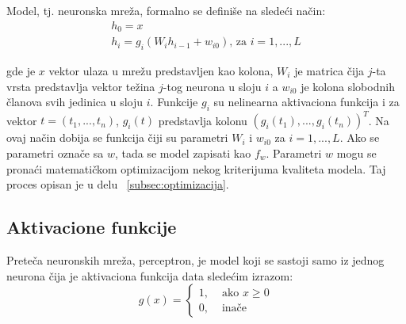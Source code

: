 Model, tj. neuronska mreža, formalno se definiše na sledeći način:
\begin{equation}
	\begin{gathered}
		h_0 = x  \\
	 	h_i = g_i(W_ih_{i-1} + w_{i0}) \text{,~za~} i=1, ..., L
	\end{gathered}
\end{equation}

gde je $x$ vektor ulaza u mrežu predstavljen kao kolona, $W_i$ je matrica čija $j$-ta vrsta predstavlja vektor težina $j$-tog neurona u sloju $i$ a $w_{i0}$ je kolona slobodnih članova svih jedinica u sloju $i$. Funkcije $g_i$ su nelinearna aktivaciona funkcija i za vektor $t=(t_1, ..., t_n)$, $g_i(t)$ predstavlja kolonu $(g_i(t_1), ..., g_i(t_n))^T$. Na ovaj način dobija se funkcija čiji su parametri $W_i$ i $w_{i0}$ za $i=1,...,L$. Ako se parametri označe sa $w$, tada se model zapisati kao $f_w$. Parametri $w$ mogu se pronaći matematičkom optimizacijom nekog kriterijuma kvaliteta modela. Taj proces opisan je u delu ~\ref{subsec:optimizacija}.

\subsection{Aktivacione funkcije}

Preteča neuronskih mreža, perceptron, je model koji se sastoji samo iz jednog neurona čija je aktivaciona funkcija data sledećim izrazom:
\begin{equation}
	g(x)=
	\begin{cases}
		1, 	& \text{~ako~} x \geq 0 \\
		0, 	& \text{~inače}
	\end{cases}
\end{equation} 

